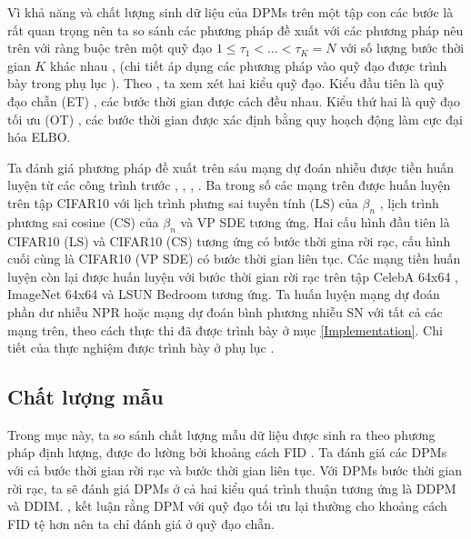 \documentclass[14pt, a4paper]{article}
\numberwithin{equation}{section}
\numberwithin{figure}{section}
\numberwithin{dl}{section}
\numberwithin{md}{section}
\numberwithin{bd}{section}
\numberwithin{dn}{section}
\numberwithin{hq}{section}
\begin{document}
    Vì khả năng và chất lượng sinh dữ liệu của DPMs trên một tập con các bước là rất quan trọng nên ta so sánh các phương pháp đề xuất với các phương pháp nêu trên với ràng buộc trên một quỹ đạo
    $1 \leq \tau_1 < \dots < \tau_K = N$ với số lượng bước thời gian $K$ khác nhau \cite{song2020denoising}, \cite{bao2021analytic} (chi tiết áp dụng các phương pháp vào quỹ đạo được trình bày trong phụ lục ).
    Theo \cite{bao2021analytic}, ta xem xét hai kiểu quỹ đạo. Kiểu đầu tiên là quỹ đạo chẵn (ET) \cite{nichol2021improved}, các bước thời gian được cách đều nhau. Kiểu thứ hai là quỹ đạo tối ưu (OT) \cite{watson2021learning}, 
    các bước thời gian được xác định bằng quy hoạch động làm cực đại hóa ELBO.

    Ta đánh giá phương pháp đề xuất trên sáu mạng dự đoán nhiễu được tiền huấn luyện từ các công trình trước \cite{ho2020denoising}, \cite{song2020denoising}, \cite{nichol2021improved}, \cite{bao2021analytic}.
    Ba trong số các mạng trên được huấn luyện trên tập CIFAR10 \cite{krizhevsky2009learning} với lịch trình phưng sai tuyến tính (LS) của $\beta_n$ \cite{ho2020denoising},
    lịch trình phương sai cosine (CS) của $\beta_n$ \cite{nichol2021improved} và VP SDE \cite{song2020score} tương ứng.
    Hai cấu hình đầu tiên là CIFAR10 (LS) và CIFAR10 (CS) tương ứng có bước thời gina rời rạc, cấu hình cuối cùng là CIFAR10 (VP SDE) có bước thời gian liên tục.
    Các mạng tiền huấn luyện còn lại được huấn luyện với bước thời gian rời rạc trên tập CelebA 64x64 \cite{liu2015deep}, ImageNet 64x64 \cite{deng2009imagenet} và LSUN Bedroom \cite{yu2015lsun} tương ứng.
    Ta huấn luyện mạng dự đoán phần dư nhiễu NPR hoặc mạng dự đoán bình phương nhiễu SN với tất cả các mạng trên, theo cách thực thi đã được trình bày ở mục \ref{Implementation}.
    Chi tiết của thực nghiệm được trình bày ở phụ lục .

    \subsection{Chất lượng mẫu}

    Trong mục này, ta so sánh chất lượng mẫu dữ liệu được sinh ra theo phương pháp định lượng, được đo lường bởi khoảng cách FID \cite{heusel2017gans}.
    Ta đánh giá các DPMs với cả bước thời gian rời rạc và bước thời gian liên tục. Với DPMs bước thời gian rời rạc, ta sẽ đánh giá DPMs ở cả hai kiểu quá trình thuận tương ứng là DDPM và DDIM.
    \cite{watson2021learning}, \cite{bao2021analytic} kết luận rằng DPM với quỹ đạo tối ưu lại thường cho khoảng cách FID tệ hơn nên ta chỉ đánh giá ở quỹ đạo chẵn.
\end{document}
